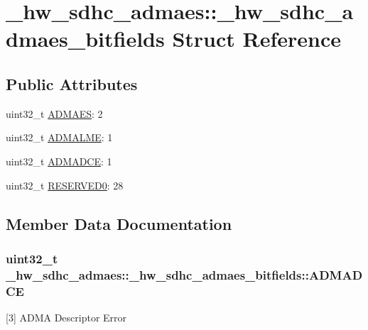 \hypertarget{struct__hw__sdhc__admaes_1_1__hw__sdhc__admaes__bitfields}{}\section{\+\_\+hw\+\_\+sdhc\+\_\+admaes\+:\+:\+\_\+hw\+\_\+sdhc\+\_\+admaes\+\_\+bitfields Struct Reference}
\label{struct__hw__sdhc__admaes_1_1__hw__sdhc__admaes__bitfields}
\subsection*{Public Attributes}
\begin{DoxyCompactItemize}
\item 
uint32\+\_\+t \hyperlink{struct__hw__sdhc__admaes_1_1__hw__sdhc__admaes__bitfields_ab6891f6f5fcbe28395e8b03a6591702c}{A\+D\+M\+A\+ES}\+: 2
\item 
uint32\+\_\+t \hyperlink{struct__hw__sdhc__admaes_1_1__hw__sdhc__admaes__bitfields_a0192847aa5b6999a3dcb1e65b528e9fa}{A\+D\+M\+A\+L\+ME}\+: 1
\item 
uint32\+\_\+t \hyperlink{struct__hw__sdhc__admaes_1_1__hw__sdhc__admaes__bitfields_aa85d4ad50852bf3e5d4bb9eae5a60c00}{A\+D\+M\+A\+D\+CE}\+: 1
\item 
uint32\+\_\+t \hyperlink{struct__hw__sdhc__admaes_1_1__hw__sdhc__admaes__bitfields_abe6319e731d6754ab2edb8e6664bb68b}{R\+E\+S\+E\+R\+V\+E\+D0}\+: 28
\end{DoxyCompactItemize}


\subsection{Member Data Documentation}
\subsubsection[{\texorpdfstring{A\+D\+M\+A\+D\+CE}{ADMADCE}}]{\setlength{\rightskip}{0pt plus 5cm}uint32\+\_\+t \+\_\+hw\+\_\+sdhc\+\_\+admaes\+::\+\_\+hw\+\_\+sdhc\+\_\+admaes\+\_\+bitfields\+::\+A\+D\+M\+A\+D\+CE}\hypertarget{struct__hw__sdhc__admaes_1_1__hw__sdhc__admaes__bitfields_aa85d4ad50852bf3e5d4bb9eae5a60c00}{}\label{struct__hw__sdhc__admaes_1_1__hw__sdhc__admaes__bitfields_aa85d4ad50852bf3e5d4bb9eae5a60c00}
\mbox{[}3\mbox{]} A\+D\+MA Descriptor Error 
